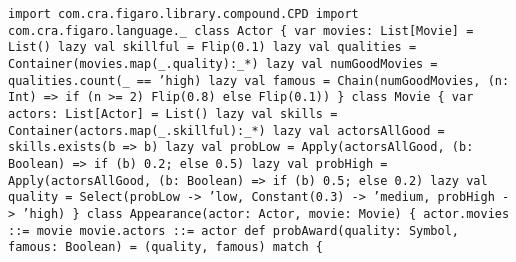 \begin{flushleft}
\texttt{import com.cra.figaro.library.compound.CPD
\newline import com.cra.figaro.language.\_
\newline 
\newline class Actor \{
\newline \tab var movies: List[Movie] = List()
\newline \tab lazy val skillful = Flip(0.1)
\newline \tab lazy val qualities = Container(movies.map(\_.quality):\_*)
\newline \tab lazy val numGoodMovies = qualities.count(\_ == 'high)
\newline \tab lazy val famous = Chain(numGoodMovies, (n: Int) => 
\newline \tab if (n >= 2) Flip(0.8) else Flip(0.1))
\newline \}
\newline 
\newline class Movie \{
\newline \tab var actors: List[Actor] = List()
\newline \tab lazy val skills = Container(actors.map(\_.skillful):\_*)
\newline \tab lazy val actorsAllGood = skills.exists(b => b)
\newline \tab lazy val probLow = 
\newline \tab Apply(actorsAllGood, (b: Boolean) => if (b) 0.2; else 0.5)
\newline \tab lazy val probHigh = 
\newline \tab Apply(actorsAllGood, (b: Boolean) => if (b) 0.5; else 0.2)
\newline \tab lazy val quality = 
\newline \tab Select(probLow -> 'low, Constant(0.3) -> 'medium, probHigh -> 'high)
\newline \}
\newline 
\newline class Appearance(actor: Actor, movie: Movie) \{
\newline \tab actor.movies ::= movie
\newline \tab movie.actors ::= actor
\newline 
\newline \tab def probAward(quality: Symbol, famous: Boolean) =
\newline \tab \tab (quality, famous) match \{
}
\end{flushleft}
